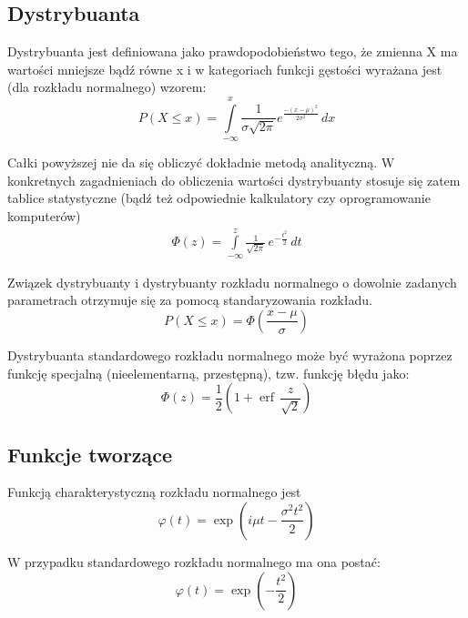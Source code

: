 \documentclass{article}
\begin{document}
\subsection*{Dystrybuanta}
Dystrybuanta jest definiowana jako prawdopodobieństwo tego, że zmienna X ma wartości mniejsze bądź równe x i w kategoriach funkcji gęstości wyrażana jest (dla rozkładu normalnego) wzorem: 
\begin{equation*}
P(X \leq x)=\int \limits _{-\infty }^{x}{\frac {1}{\sigma {\sqrt {2\pi }}}}e^{\frac {-(x-\mu )^{2}}{2\sigma ^{2}}}\,dx
\end{equation*}

Całki powyższej nie da się obliczyć dokładnie metodą analityczną. W konkretnych zagadnieniach do obliczenia wartości dystrybuanty stosuje się zatem tablice statystyczne (bądź też odpowiednie kalkulatory czy oprogramowanie komputerów)
\begin{gather*}
\Phi (z)=\int \limits _{-\infty }^{z}{\frac {1}{\sqrt {2\pi }}}\,e^{-{\frac {t^{2}}{2}}}\,dt
\end{gather*}

Związek dystrybuanty i dystrybuanty rozkładu normalnego o dowolnie zadanych parametrach otrzymuje się za pomocą standaryzowania rozkładu. 
$$ P(X\leq x)=\Phi \left({\frac {x-\mu }{\sigma }}\right) $$

Dystrybuanta standardowego rozkładu normalnego może być wyrażona poprzez funkcję specjalną (nieelementarną, przestępną), tzw. funkcję błędu jako: 
\begin{displaymath}
\Phi (z)={\frac {1}{2}}\left(1+\operatorname {erf} \,{\frac {z}{\sqrt {2}}}\right)
\end{displaymath}

\subsection*{Funkcje tworzące}
Funkcją charakterystyczną rozkładu normalnego jest 
\begin{equation*}
\varphi (t)=\exp \left(i\mu t-{\frac {\sigma ^{2}t^{2}}{2}}\right)
\end{equation*}

W przypadku standardowego rozkładu normalnego ma ona postać:
$$ \varphi (t)=\exp \left(-{\frac {t^{2}}{2}}\right) $$
\end{document}
